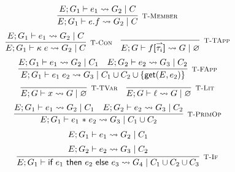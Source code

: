 \begin{figure}
    \centering
    \[
        \infer[\textsc{\footnotesize T-Member}]{
            E; G_1 \vdash e.f
                \rightsquigarrow G_2\; |\; C
        }{
            E; G_1 \vdash e_1 \rightsquigarrow G_2\; |\; C
        }
    \]
    \vspace{0.5pt}
    \[
        \infer[\textsc{\footnotesize T-Con}]{
            E; G_1 \vdash \kappa\; e
                \rightsquigarrow G_2\; |\; C
        }{
            E; G_1 \vdash e_1 \rightsquigarrow G_2\; |\; C
        }
        \hspace{1em}
        \infer[\textsc{\footnotesize T-TApp}]{
            E; G \vdash f\textbf{[}\harpoon{\tau_i}\textbf{]}
                \rightsquigarrow G\; |\; \varnothing
        }{
        }
    \]
    \vspace{0.5pt}
    \[
        \infer[\textsc{\footnotesize T-FApp}]{
            E; G_1 \vdash e_1\; e_2
                \rightsquigarrow G_3\; |\; C_1 \cup C_2 
                \cup \{\textsf{get}(E,e_2)\}
        }{
            E; G_1 \vdash e_1 \rightsquigarrow G_2\; |\; C_1
            \hspace{1em}
            E; G_2 \vdash e_2 \rightsquigarrow G_3\; |\; C_2
        }
    \]
    \vspace{0.5pt}
    \[
        \infer[\textsc{\footnotesize T-TVar}]{
            E; G \vdash x
                \rightsquigarrow G\; |\; \varnothing
        }{}
        \hspace{1em}
        \infer[\textsc{\footnotesize T-Lit}]{
            E; G \vdash \ell
                \rightsquigarrow G\; |\; \varnothing
        }{}
    \]
    \vspace{0.5pt}
    \[
        \infer[\textsc{\footnotesize T-PrimOp}]{
            E; G_1 \vdash e_1 \text{ \textasteriskcentered }\; e_2
                \rightsquigarrow G_3\; |\; C_1 \cup C_2
        }{
            E; G_1 \vdash e_1 \rightsquigarrow G_2\; |\; C_1
            \hspace{1em}
            E; G_2 \vdash e_2 \rightsquigarrow G_3\; |\; C_2
        }
    \]
    \vspace{0.5pt}
    \[
        \infer[\textsc{\footnotesize T-If}]{
            E; G_1 \vdash \textsf{if } e_1 \textsf{ then } e_2 \textsf{ else } e_3
                \rightsquigarrow G_4\; |\; C_1 \cup C_2 \cup C_3
        }{
            \begin{array}{c}
                E; G_1 \vdash e_1 \rightsquigarrow G_2\; |\; C_1 \\[5pt]
                E; G_2 \vdash e_2 \rightsquigarrow G_3\; |\; C_2

\end{array}}\]
\end{figure}
